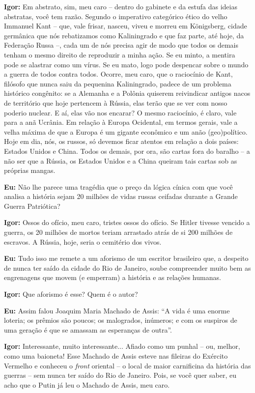 \textbf{Igor:} Em abstrato, sim, meu caro -- dentro do gabinete e da
estufa das ideias abstratas, você tem razão. Segundo o imperativo
categórico ético do velho Immanuel Kant -- que, vale frisar, nasceu,
viveu e morreu em Königsberg, cidade germânica que nós rebatizamos como
Kaliningrado e que faz parte, até hoje, da Federação Russa --, cada um
de nós precisa agir de modo que todos os demais tenham o mesmo direito
de reproduzir a minha ação. Se eu minto, a mentira pode se alastrar como
um vírus. Se eu mato, logo pode despencar sobre o mundo a guerra de
todos contra todos. Ocorre, meu caro, que o raciocínio de Kant, filósofo
que nunca saiu da pequenina Kaliningrado, padece de um problema
histórico congênito: se a Alemanha e a Polônia quiserem reivindicar
antigos nacos de território que hoje pertencem à Rússia, elas terão que
se ver com nosso poderio nuclear. E aí, elas vão nos encarar? O mesmo
raciocínio, é claro, vale para a anã Ucrânia. Em relação à Europa
Ocidental, em termos gerais, vale a velha máxima de que a Europa é um
gigante econômico e um anão (geo)político. Hoje em dia, nós, os russos,
só devemos ficar atentos em relação a dois países: Estados Unidos e
China. Todos os demais, por ora, são cartas fora do baralho -- a não ser
que a Rússia, os Estados Unidos e a China queiram tais cartas sob as
próprias mangas.

\textbf{Eu:} Não lhe parece uma tragédia que o preço da lógica cínica
com que você analisa a história sejam 20 milhões de vidas russas
ceifadas durante a Grande Guerra Patriótica?

\textbf{Igor:} Ossos do ofício, meu caro, tristes ossos do ofício. Se
Hitler tivesse vencido a guerra, os 20 milhões de mortos teriam
arrastado atrás de si 200 milhões de escravos. A Rússia, hoje, seria o
cemitério dos vivos.

\textbf{Eu:} Tudo isso me remete a um aforismo de um escritor brasileiro
que, a despeito de nunca ter saído da cidade do Rio de Janeiro, soube
compreender muito bem as engrenagens que movem (e emperram) a história e
as relações humanas.

\textbf{Igor:} Que aforismo é esse? Quem é o autor?

\textbf{Eu:} Assim falou Joaquim Maria Machado de Assis: ``A vida é uma
enorme loteria; os prêmios são poucos; os malogrados, inúmeros; e com os
suspiros de uma geração é que se amassam as esperanças de outra''.

\textbf{Igor:} Interessante, muito interessante... Afiado como um punhal
-- ou, melhor, como uma baioneta! Esse Machado de Assis esteve nas
fileiras do Exército Vermelho e conheceu o \emph{front} oriental -- o
local de maior carnificina da história das guerras -- sem nunca ter
saído do Rio de Janeiro. Pois, se você quer saber, eu acho que o Putin
já leu o Machado de Assis, meu caro.

